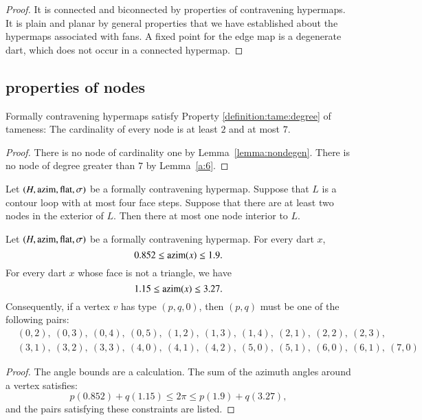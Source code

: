 \begin{proof}
It is connected and biconnected by properties of contravening hypermaps.
It is plain and planar by general properties that we have established
about the hypermaps associated with fans.
A fixed point for the edge map is a degenerate dart, which does not occur in a connected hypermap.
\end{proof}





\subsection{properties of nodes}


\begin{lemma} 
Formally contravening hypermaps satisfy Property
\ref{definition:tame:degree} of tameness: The cardinality of every
node is at least $2$ and at most $7$.
\end{lemma}

\begin{proof}  There is no node of cardinality one by
Lemma~\ref{lemma:nondegen}.  There is no node of degree
greater than $7$ by Lemma~\ref{a:6}.
\end{proof}


\begin{lemma}\label{lemma:no-2}
Let $(H,{\operatorname{azim}},\operatorname{flat},\sigma)$ be a formally contravening hypermap.
Suppose that $L$ is a contour loop with at most four face steps.
Suppose that there are at least two nodes in the exterior of $L$.
Then there at most one node interior to $L$.
\end{lemma}


\begin{lemma} \label{lemma:0.852}
Let $(H,{\operatorname{azim}},\operatorname{flat},\sigma)$ be a formally contravening
hypermap. For every dart $x$,
    $$0.852\le {\operatorname{azim}}(x)\le 1.9.$$
For every dart $x$ whose face is not a triangle, we have
    $$1.15\le{\operatorname{azim}}(x)\le 3.27.$$
Consequently, if a vertex $v$ has type $(p,q,0)$, then $(p,q)$
must be one of the following pairs:
$$
\begin{array}{lll}
&(0,2),~(0,3),~(0,4),~(0,5),~(1,2),~(1,3),~(1,4),~(2,1),~(2,2),~(2,3),\\
&(3,1),~(3,2),~(3,3),~(4,0),~(4,1),~(4,2),~(5,0),~(5,1),~(6,0),~(6,1),~(7,0)
\end{array}
$$
\end{lemma}
\begin{proof}
The angle bounds are a calculation.  The sum of the azimuth angles
around a vertex satisfies:
$$
  p (0.852) + q (1.15) \le 2\pi \le p (1.9) + q (3.27),
$$
and the pairs satisfying these constraints are listed.
\end{proof}



